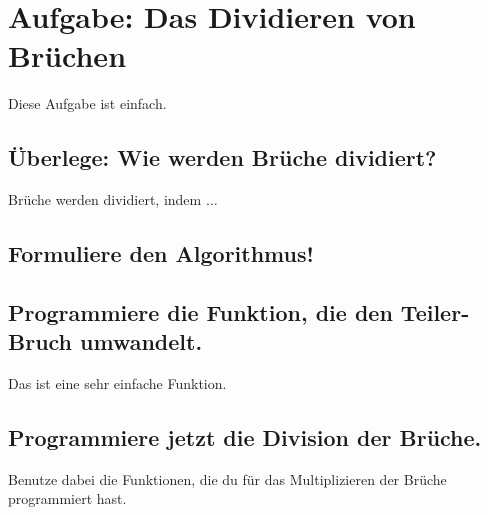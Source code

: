 \section{Aufgabe: Das Dividieren von Brüchen}

Diese Aufgabe ist einfach.

\subsection*{Überlege: Wie werden Brüche dividiert?}

Brüche werden dividiert, indem $\dots$

\subsection*{Formuliere den Algorithmus!}

\subsection*{Programmiere die Funktion, die den Teiler-Bruch umwandelt.}

Das ist eine sehr einfache Funktion.

\subsection*{Programmiere jetzt die Division der Brüche.}

Benutze dabei die Funktionen, die du für das Multiplizieren der Brüche programmiert hast.
